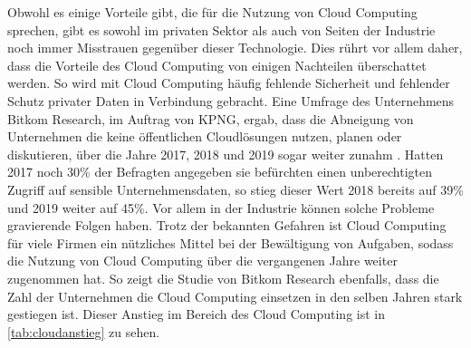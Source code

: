 Obwohl es einige Vorteile gibt, die für die Nutzung von Cloud Computing sprechen, gibt es sowohl im privaten Sektor als auch von Seiten der Industrie noch immer Misstrauen gegenüber dieser Technologie. 
Dies rührt vor allem daher, dass die Vorteile des Cloud Computing von einigen Nachteilen überschattet werden. So wird mit Cloud Computing häufig fehlende Sicherheit und fehlender Schutz privater Daten in Verbindung gebracht. 
Eine Umfrage des Unternehmens Bitkom Research, im Auftrag von KPNG, ergab, dass die Abneigung von Unternehmen die keine öffentlichen Cloudlösungen nutzen, planen oder diskutieren, über die Jahre 2017, 2018 und 2019 sogar weiter zunahm \cite{heidkamp2020}. Hatten 2017 noch 30\% der Befragten angegeben sie befürchten einen unberechtigten Zugriff auf sensible Unternehmensdaten, so stieg dieser Wert 2018 bereits auf 39\% und 2019 weiter auf 45\%.
Vor allem in der Industrie können solche Probleme gravierende Folgen haben. 
Trotz der bekannten Gefahren ist Cloud Computing für viele Firmen ein nützliches Mittel bei der Bewältigung von Aufgaben, sodass die Nutzung von Cloud Computing über die vergangenen Jahre weiter zugenommen hat.
So zeigt die Studie von Bitkom Research ebenfalls, dass die Zahl der Unternehmen die  Cloud Computing einsetzen in den selben Jahren stark gestiegen ist. Dieser Anstieg im Bereich des Cloud Computing ist in \autoref{tab:cloudanstieg} zu sehen.

